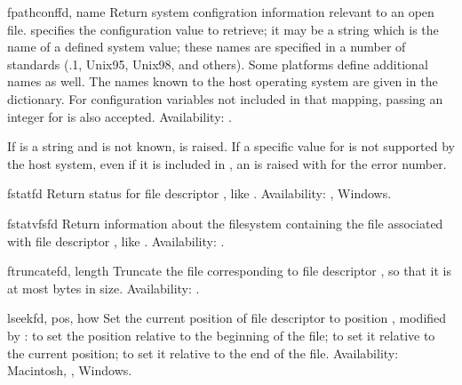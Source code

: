 \begin{funcdesc}{fpathconf}{fd, name}
Return system configration information relevant to an open file.
 specifies the configuration value to retrieve; it may be a
string which is the name of a defined system value; these names are
specified in a number of standards (\POSIX.1, Unix95, Unix98, and
others).  Some platforms define additional names as well.  The names
known to the host operating system are given in the
 dictionary.  For configuration variables not
included in that mapping, passing an integer for  is also
accepted.
Availability: \UNIX{}.

If  is a string and is not known,  is
raised.  If a specific value for  is not supported by the
host system, even if it is included in , an
 is raised with  for the
error number.
\end{funcdesc}

\begin{funcdesc}{fstat}{fd}
Return status for file descriptor , like .
Availability: \UNIX{}, Windows.
\end{funcdesc}

\begin{funcdesc}{fstatvfs}{fd}
Return information about the filesystem containing the file associated
with file descriptor , like .
Availability: \UNIX{}.
\end{funcdesc}

\begin{funcdesc}{ftruncate}{fd, length}
Truncate the file corresponding to file descriptor , 
so that it is at most  bytes in size.
Availability: \UNIX{}.
\end{funcdesc}

\begin{funcdesc}{lseek}{fd, pos, how}
Set the current position of file descriptor  to position
, modified by :  to set the position
relative to the beginning of the file;  to set it relative to
the current position;  to set it relative to the end of the
file.
Availability: Macintosh, \UNIX{}, Windows.
\end{funcdesc}

